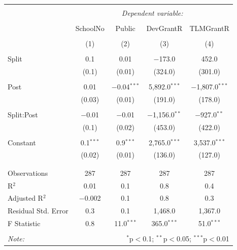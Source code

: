 \documentclass[12pt, a4paper]{article}
\begin{document}
\begin{table}[!htbp] \centering 
  \caption{} 
  \label{} 
\begin{tabular}{@{\extracolsep{5pt}}lcccc} 
\\[-1.8ex]\hline 
\hline \\[-1.8ex] 
 & \multicolumn{4}{c}{\textit{Dependent variable:}} \\ 
\cline{2-5} 
\\[-1.8ex] & SchoolNo & Public & DevGrantR & TLMGrantR \\ 
\\[-1.8ex] & (1) & (2) & (3) & (4)\\ 
\hline \\[-1.8ex] 
 Split & 0.1 & 0.01 & $-$173.0 & 452.0 \\ 
  & (0.1) & (0.01) & (324.0) & (301.0) \\ 
  & & & & \\ 
 Post & 0.01 & $-$0.04$^{***}$ & 5,892.0$^{***}$ & $-$1,807.0$^{***}$ \\ 
  & (0.03) & (0.01) & (191.0) & (178.0) \\ 
  & & & & \\ 
 Split:Post & $-$0.01 & $-$0.01 & $-$1,156.0$^{**}$ & $-$927.0$^{**}$ \\ 
  & (0.1) & (0.02) & (453.0) & (422.0) \\ 
  & & & & \\ 
 Constant & 0.1$^{***}$ & 0.9$^{***}$ & 2,765.0$^{***}$ & 3,537.0$^{***}$ \\ 
  & (0.02) & (0.01) & (136.0) & (127.0) \\ 
  & & & & \\ 
\hline \\[-1.8ex] 
Observations & 287 & 287 & 287 & 287 \\ 
R$^{2}$ & 0.01 & 0.1 & 0.8 & 0.4 \\ 
Adjusted R$^{2}$ & $-$0.002 & 0.1 & 0.8 & 0.3 \\ 
Residual Std. Error & 0.3 & 0.1 & 1,468.0 & 1,367.0 \\ 
F Statistic & 0.8 & 11.0$^{***}$ & 365.0$^{***}$ & 51.0$^{***}$ \\ 
\hline 
\hline \\[-1.8ex] 
\textit{Note:}  & \multicolumn{4}{r}{$^{*}$p$<$0.1; $^{**}$p$<$0.05; $^{***}$p$<$0.01} \\ 
\end{tabular} 
\end{table} %
\end{document}
